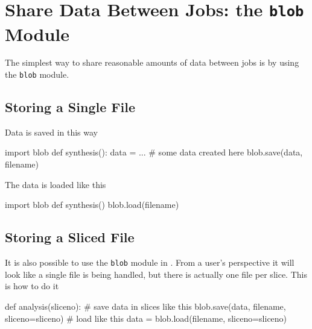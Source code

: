 

\clearpage
\section{Share Data Between Jobs:  the \texttt{blob} Module}

The simplest way to share reasonable amounts of data between jobs is
by using the
\texttt{blob} module.

\subsection*{Storing a  Single File}
Data is saved in this way
\begin{python}
import blob
def synthesis():
    data = ...  # some data created here
    blob.save(data, filename)
\end{python}
The data is loaded like this
\begin{python}
import blob
def synthesis()
    blob.load(filename)
\end{python}

\subsection*{Storing a Sliced File}
It is also possible to use the \texttt{blob} module in \analysis.
From a user's perspective it will look like a single file is being
handled, but there is actually one file per slice.  This is how to do
it
\begin{python}
def analysis(sliceno):
    # save data in slices like this
    blob.save(data, filename, sliceno=sliceno)
    # load like this
    data = blob.load(filename, sliceno=sliceno)
\end{python}


